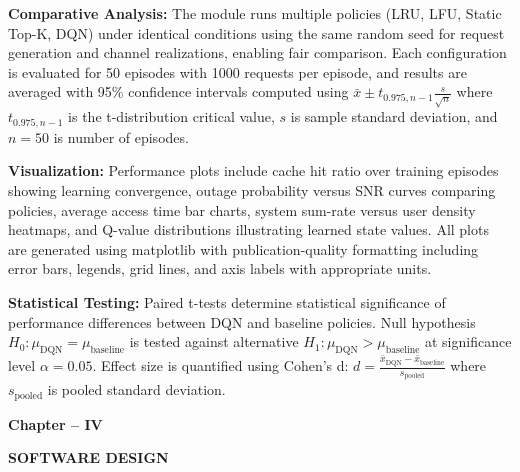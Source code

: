 \documentclass[12pt,a4paper]{article}
\begin{document}
\textbf{Comparative Analysis:} The module runs multiple policies (LRU, LFU, Static Top-K, DQN) under identical conditions using the same random seed for request generation and channel realizations, enabling fair comparison. Each configuration is evaluated for 50 episodes with 1000 requests per episode, and results are averaged with 95\% confidence intervals computed using $\bar{x} \pm t_{0.975, n-1} \frac{s}{\sqrt{n}}$ where $t_{0.975, n-1}$ is the t-distribution critical value, $s$ is sample standard deviation, and $n = 50$ is number of episodes.

\textbf{Visualization:} Performance plots include cache hit ratio over training episodes showing learning convergence, outage probability versus SNR curves comparing policies, average access time bar charts, system sum-rate versus user density heatmaps, and Q-value distributions illustrating learned state values. All plots are generated using matplotlib with publication-quality formatting including error bars, legends, grid lines, and axis labels with appropriate units.

\textbf{Statistical Testing:} Paired t-tests determine statistical significance of performance differences between DQN and baseline policies. Null hypothesis $H_0: \mu_{\text{DQN}} = \mu_{\text{baseline}}$ is tested against alternative $H_1: \mu_{\text{DQN}} > \mu_{\text{baseline}}$ at significance level $\alpha = 0.05$. Effect size is quantified using Cohen's d: $d = \frac{\bar{x}_{\text{DQN}} - \bar{x}_{\text{baseline}}}{s_{\text{pooled}}}$ where $s_{\text{pooled}}$ is pooled standard deviation.

\thispagestyle{plain}


\clearpage

\begin{center}
    \vspace*{10cm}
    
    {\fontsize{16}{19.2}\selectfont\bfseries
    Chapter -- IV}
    
    \vspace{1cm}
    
    {\fontsize{16}{19.2}\selectfont\bfseries
    SOFTWARE DESIGN}
    
    \vspace*{\fill}
\end{center}
\end{document}
